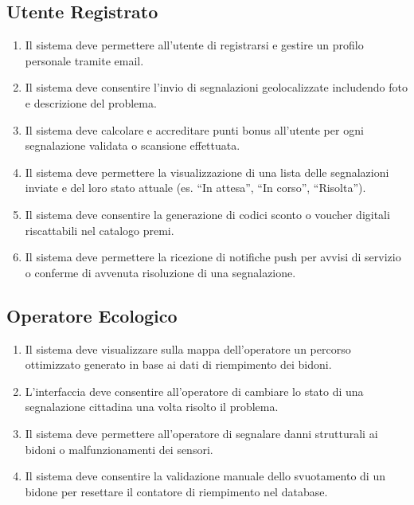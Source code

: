 \documentclass[12pt,a4paper]{article}
\begin{document}
\subsection{Utente Registrato}
\begin{enumerate}[label=\textbf{(RF\arabic*)}, resume]
    \item Il sistema deve permettere all'utente di registrarsi e gestire un profilo personale tramite email.
    \item Il sistema deve consentire l'invio di segnalazioni geolocalizzate includendo foto e descrizione del problema.
    \item Il sistema deve calcolare e accreditare punti bonus all'utente per ogni segnalazione validata o scansione effettuata.
    \item Il sistema deve permettere la visualizzazione di una lista delle segnalazioni inviate e del loro stato attuale (es. ``In attesa'', ``In corso'', ``Risolta'').
    \item Il sistema deve consentire la generazione di codici sconto o voucher digitali riscattabili nel catalogo premi.
    \item Il sistema deve permettere la ricezione di notifiche push per avvisi di servizio o conferme di avvenuta risoluzione di una segnalazione.
\end{enumerate}

\subsection{Operatore Ecologico}
\begin{enumerate}[label=\textbf{(RF\arabic*)}, resume]
    \item Il sistema deve visualizzare sulla mappa dell'operatore un percorso ottimizzato generato in base ai dati di riempimento dei bidoni.
    \item L'interfaccia deve consentire all'operatore di cambiare lo stato di una segnalazione cittadina una volta risolto il problema.
    \item Il sistema deve permettere all'operatore di segnalare danni strutturali ai bidoni o malfunzionamenti dei sensori.
    \item Il sistema deve consentire la validazione manuale dello svuotamento di un bidone per resettare il contatore di riempimento nel database.
\end{enumerate}
\end{document}
